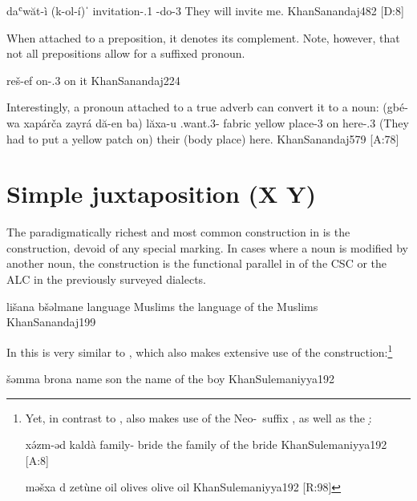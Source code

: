 {daʿwăt-ì (k-ol-í)ˈ}
{invitation-\poss.1\sg{} \ind-do-3\pl}
{They will invite me.}
{KhanSanandaj}{482 {[D:8]}}

  
When attached to a preposition, it denotes its complement. Note, however, that not all prepositions allow for a suffixed pronoun.

{reš-ef}
{on-\poss.3\masc}
{on it}
{KhanSanandaj}{224}

Interestingly, a pronoun attached to a true adverb can convert it to a noun:
{(gbé-wa xa\cb{}párča zayrá dă-en  ba\cb{}) lăxa-u}
{\ind.want.3\masc-\pst{} \indef\cb{}fabric yellow place-3\pl{} on\cb{} here-\poss.3\pl}
{(They had to put a yellow patch on) their (body place) here.\footnotemark}
{KhanSanandaj}{579 {[A:78]}}\vspace*{-4mm}

 \section{Simple juxtaposition (X Y)} \label{ss:JSan_juxt}
 \largerpage[2]
 The paradigmatically richest and most common construction in \JSan is the  construction, devoid of any special marking. In cases where a noun is modified by another noun, the  construction is the  functional parallel in \JSan of the CSC or the ALC in the previously surveyed   dialects. 
 
{lišana bšəlmane}
{language Muslims}
{the language of the Muslims}
{KhanSanandaj}{199}

  
In this \JSan is very similar to \JSul, which also makes extensive use of the  construction:\footnote{Yet, in contrast to \JSan, \JSul also makes use of the Neo-\cst\ suffix \ed, as well as the \lnk* \d:

{xə́zm-əd kaldà}
{family-\cst{} bride}
{the family of the bride}
{KhanSulemaniyya}{192 {[A:8]}}
\vspace*{-2mm}

{məšxa d\cb{} zetùne}
{oil \lnk\cb{} olives}
{olive oil}
{KhanSulemaniyya}{192 {[R:98]}}
\vspace*{-1mm}
}

{šəmma brona}
{name son}
{the name of the boy}
{KhanSulemaniyya}{192}
   

